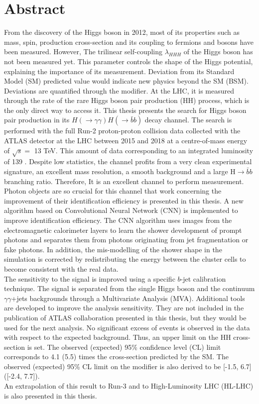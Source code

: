 \chapter*{Abstract}
From the discovery of the Higgs boson in 2012, most of its properties such as mass, spin, production cross-section and its coupling to fermions and bosons have been measured. However, The trilinear self-coupling $\lambda_{HHH}$ of the Higgs boson has not been measured yet. This parameter controls the shape of the Higgs potential, explaining the importance of its measurement. Deviation from its Standard Model (SM) predicted value would indicate new physics beyond the SM (BSM). Deviations are quantified through the \kl modifier. At the LHC, it is measured through the rate of the rare Higgs boson pair production (HH) process, which is the only direct way to access it. This thesis presents the search for Higgs boson pair production in its $H(\to\gamma\gamma)H(\to\bar{b}b)$ decay channel. The search is performed with the full Run-2 proton-proton collision data collected with the ATLAS detector at the LHC between 2015 and 2018 at a centre-of-mass energy of $\sqrt{s} = $ 13 TeV. This amount of data corresponding to an integrated luminosity of 139 \ifb. Despite low statistics, the \bbyy channel profits from a very clean experimental signature, an excellent \myy mass resolution, a smooth background and a large H$\to\bar{b}b$ branching ratio. Therefore, It is an excellent channel to perform \kl measurement. \\
Photon objects are so crucial for this channel that work concerning the improvement of their identification efficiency is presented in this thesis. A new algorithm based on Convolutional Neural Network (CNN) is implemented to improve identification efficiency. The CNN algorithm uses images from the electromagnetic calorimeter layers to learn the shower development of prompt photons and separates them from photons originating from jet fragmentation or fake photons. In addition, the mis-modelling of the shower shape in the simulation is corrected by redistributing the energy between the cluster cells to become consistent with the real data. \\
The sensitivity to the \HHyybb signal is improved using a specific $b$-jet calibration technique. The signal is separated from the single Higgs boson and the continuum $\gamma\gamma$+jets backgrounds through a Multivariate Analysis (MVA). Additional tools are developed to improve the analysis sensitivity. They are not included in the publication of ATLAS collaboration presented in this thesis, but they would be used for the next analysis. No significant excess of \HHyybb events is observed in the data with respect to the expected background. Thus, an upper limit on the HH cross-section is set. The observed (expected) 95\% confidence level (CL) limit corresponds to 4.1 (5.5) times the cross-section predicted by the SM. The observed (expected) 95\% CL limit on the \kl modifier is also derived to be [-1.5, 6.7] ([-2.4, 7.7]).  \\
An extrapolation of this result to Run-3 and to High-Luminosity LHC (HL-LHC) is also presented in this thesis.

